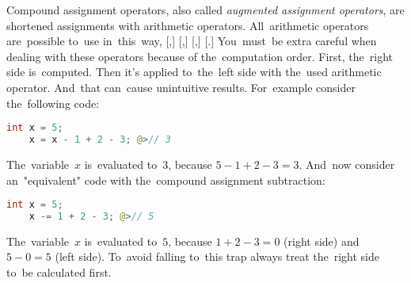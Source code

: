 Compound assignment operators, also called \textit{augmented assignment operators}, are shortened assignments with arithmetic operators.
All~arithmetic operators are~possible to~use in~this~way, \mbitqs[i.e.,]{+=}[,] \mbitqs{-=}[,] \mbitqs{$\star$=}[,] \mbitqs{/=} \mbitqs[and]{\%=}[.]
You~must~be extra careful when dealing with these operators because of the~computation order.
First, the~right side is~computed.
Then it's applied to~the~left side with the~used arithmetic operator.
And~that can~cause unintuitive results.
For~example consider the~following code:
\begin{lstlisting}[language=Java, frame=no]
    int x = 5;
    x = x - 1 + 2 - 3; @>// 3
\end{lstlisting}

\noindent The~variable~$x$ is~evaluated to~$3$, because $5-1+2-3=3$.
And~now consider an~"equivalent" code with the~compound assignment subtraction:
\begin{lstlisting}[language=Java, frame=no]
    int x = 5;
    x -= 1 + 2 - 3; @>// 5
\end{lstlisting}

\noindent The~variable~$x$ is~evaluated to~$5$, because $1+2-3=0$ (right side) and~$5-0=5$ (left side).
To~avoid falling to~this trap always treat the~right side to~be calculated first.
